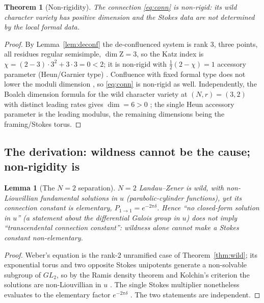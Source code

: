\documentclass[11pt]{article}
\newtheorem{theorem}{Theorem}
\newtheorem{lemma}{Lemma}
\theoremstyle{definition}
\theoremstyle{remark}
\newcommand{\Stab}{\mathrm{Z}}
\begin{document}
\begin{theorem}[Non-rigidity]\label{thm:nonrigid}
The connection \eqref{eq:conn} is non-rigid: its wild character variety has positive
dimension and the Stokes data are not determined by the local formal data.
\end{theorem}

\begin{proof}
By Lemma~\ref{lem:deconf} the de-confluenced system is rank $3$, three points, all residues
regular semisimple, $\dim\Stab=3$, so the Katz index is
$\chi=(2-3)\cdot3^2+3\cdot3=0<2$; it is non-rigid with $\tfrac12(2-\chi)=1$ accessory
parameter (Heun/Garnier type) \cite{Katz1996}. Confluence with fixed formal type does not
lower the moduli dimension \cite{JMU1981,Boalch2014}, so \eqref{eq:conn} is non-rigid as well.
Independently, the Boalch dimension formula for the wild character variety at $(N,r)=(3,2)$
with distinct leading rates gives $\dim=6>0$ \cite{Boalch2014}; the single Heun accessory
parameter is the leading modulus, the remaining dimensions being the framing/Stokes torus.
\end{proof}

\subsection{The derivation: wildness cannot be the cause; non-rigidity is}

\begin{lemma}[The $N{=}2$ separation]\label{lem:N2}
$N{=}2$ Landau--Zener is wild, with non-Liouvillian fundamental solutions in $u$
(parabolic-cylinder functions), yet its connection constant is elementary,
$P_{1\to1}=e^{-2\pi\delta}$. Hence ``no closed-form solution in $u$'' (a statement about the
differential Galois group in $u$) does \emph{not} imply ``transcendental connection
constant'': wildness alone cannot make a Stokes constant non-elementary.
\end{lemma}

\begin{proof}
Weber's equation is the rank-$2$ unramified case of Theorem~\ref{thm:wild}; its exponential
torus and two opposite Stokes unipotents generate a non-solvable subgroup of $GL_2$, so by
the Ramis density theorem and Kolchin's criterion the solutions are non-Liouvillian in $u$
\cite{Ramis1985,vdPS2003,Kolchin1973}. The single Stokes multiplier nonetheless evaluates to
the elementary factor $e^{-2\pi\delta}$ \cite{JMU1981}. The two statements are independent.
\end{proof}
\end{document}
